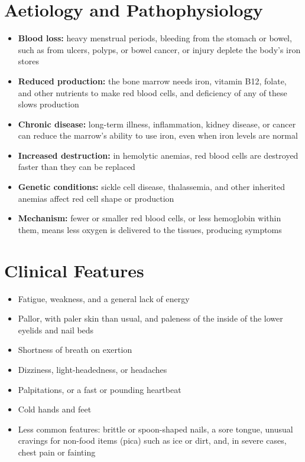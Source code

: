 \section*{Aetiology and Pathophysiology}
\begin{itemize}
    \item \textbf{Blood loss:} heavy menstrual periods, bleeding from the stomach or bowel, such as from ulcers, polyps, or bowel cancer, or injury deplete the body's iron stores
    \item \textbf{Reduced production:} the bone marrow needs iron, vitamin B12, folate, and other nutrients to make red blood cells, and deficiency of any of these slows production
    \item \textbf{Chronic disease:} long-term illness, inflammation, kidney disease, or cancer can reduce the marrow's ability to use iron, even when iron levels are normal
    \item \textbf{Increased destruction:} in hemolytic anemias, red blood cells are destroyed faster than they can be replaced
    \item \textbf{Genetic conditions:} sickle cell disease, thalassemia, and other inherited anemias affect red cell shape or production
    \item \textbf{Mechanism:} fewer or smaller red blood cells, or less hemoglobin within them, means less oxygen is delivered to the tissues, producing symptoms
\end{itemize}

\section*{Clinical Features}
\begin{itemize}
    \item Fatigue, weakness, and a general lack of energy
    \item Pallor, with paler skin than usual, and paleness of the inside of the lower eyelids and nail beds
    \item Shortness of breath on exertion
    \item Dizziness, light-headedness, or headaches
    \item Palpitations, or a fast or pounding heartbeat
    \item Cold hands and feet
    \item Less common features: brittle or spoon-shaped nails, a sore tongue, unusual cravings for non-food items (pica) such as ice or dirt, and, in severe cases, chest pain or fainting
\end{itemize}

